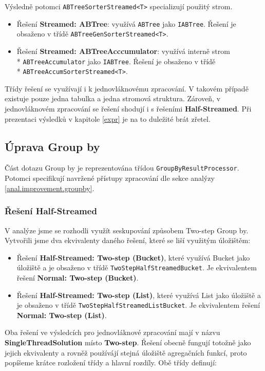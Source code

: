 Výsledně potomci \texttt{ABTreeSorterStreamed<T>} specializují použitý strom.
\begin{itemize}
\item Řešení \textbf{Streamed: ABTree}: využívá \texttt{ABTree} jako \texttt{IABTree}.
Řešení je obsaženo v třídě \texttt{ABTreeGenSorterStreamed<T>}.
\item Řešení \textbf{Streamed: ABTreeAcccumulator}: využívá interně strom\\* \texttt{ABTreeAccumulator} jako \texttt{IABTree}.
Řešení je obsaženo v třídě\\* \texttt{ABTreeAccumSorterStreamed<T>}.
\end{itemize}

Třídy řešení se využívají i k jednovláknovému zpracování.
V takovém případě existuje pouze jedna tabulka a jedna stromová struktura.
Zároveň, v jednovláknovém zpracování se řešení shodují i s řešeními \textbf{Half-Streamed}.
Při prezentaci výsledků v kapitole \ref{expr} je na to duležité brát zřetel.

\subsection{Úprava Group by}

Část dotazu Group by je reprezentována třídou \texttt{GroupByResultProcessor}.
Potomci specifikují navržené přístupy zpracování dle sekce analýzy \ref{anal.improvement.groupby}.

\subsubsection{Řešení Half-Streamed}

V analýze jsme se rozhodli využít seskupování způsobem Two-step Group by.
Vytvořili jsme dva ekvivalenty daného řešení, které se liší využitým úložištěm: 
\begin{itemize}
\item Řešení \textbf{Half-Streamed: Two-step (Bucket)}, které využívá Bucket jako úložiště a je obsaženo v třídě \texttt{TwoStepHalfStreamedBucket}.
Je ekvivalentem řešení \textbf{Normal: Two-step (Bucket)}.
\item Řešení \textbf{Half-Streamed: Two-step (List)}, které využívá List jako úložiště a je obsaženo v třídě \texttt{TwoStepHalfStreamedListBucket}.
Je ekvivalentem řešení \textbf{Normal: Two-step (List)}.
\end{itemize}
Oba řešení ve výsledcích pro jednovláknové zpracování mají v názvu \textbf{SingleThreadSolution} místo \textbf{Two-step}.
Řešení obecně fungují totožně jako jejich ekvivalenty a rovněž používájí stejná úložiště agregačních funkcí, proto popíšeme krátce rozložení třídy a hlavní rozdíly.
Obě třídy definují:

